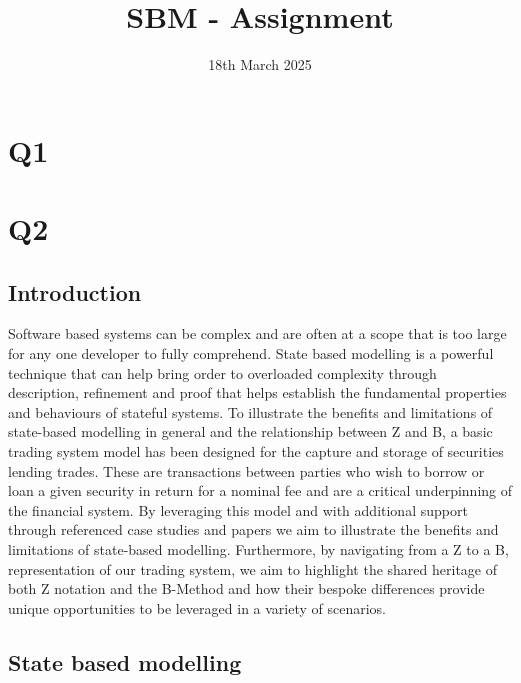 \documentclass{article}
\title{SBM - Assignment}
\date{\vspace{-1.0cm}18th March 2025}
\begin{document}
\maketitle

\pagebreak 

\section*{Q1}

\pagebreak

\section*{Q2}

\subsection*{Introduction}

Software based systems can be complex and are often at a scope that is too large for any one developer to fully comprehend. State based modelling is a powerful technique that can help bring order to overloaded complexity through description, refinement and proof that helps establish the fundamental properties and behaviours of stateful systems.
\newline \newline
To illustrate the benefits and limitations of state-based modelling in general and the relationship between Z and B, a basic trading system model has been designed for the capture and storage of securities lending trades. These are transactions between parties who wish to borrow or loan a given security in return for a nominal fee and are a critical underpinning of the financial system.
\newline \newline
By leveraging this model and with additional support through referenced case studies and papers we aim to illustrate the benefits and limitations of state-based modelling. Furthermore, by navigating from a Z to a B, representation of our trading system, we aim to highlight the shared heritage of both Z notation and the B-Method and how their bespoke differences provide unique opportunities to be leveraged in a variety of scenarios.

\subsection*{State based modelling}
\end{document}
